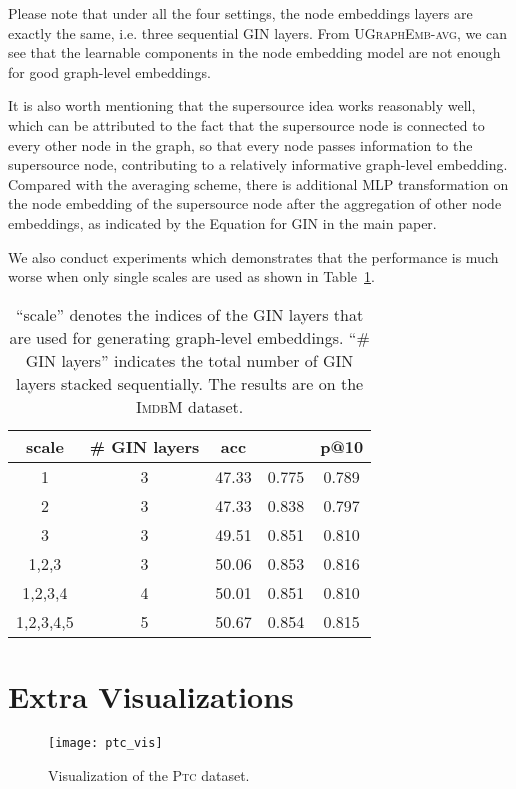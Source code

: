 \documentclass{article}
\newcommand{\model}{\textsc{UGraphEmb}\xspace}
\newcommand{\gin}{\textsc{GIN}\xspace}
\newcommand{\ptc}{\textsc{Ptc}\xspace}
\newcommand{\imdb}{\textsc{ImdbM}\xspace}
\begin{document}
Please note that under all the four settings, the node embeddings layers are exactly the same, i.e. three sequential \gin layers. From \textsc{\model}-\textsc{avg}, we can see that the learnable components in the node embedding model are not enough for good graph-level embeddings. 

It is also worth mentioning that the supersource idea works reasonably well, which can be attributed to the fact that the supersource node is connected to every other node in the graph, so that every node passes information to the supersource node, contributing to a relatively informative graph-level embedding. Compared with the averaging scheme, there is additional MLP transformation on the node embedding of the supersource node after the aggregation of other node embeddings, as indicated by the Equation for \gin in the main paper.

We also conduct experiments which demonstrates that the performance is much worse when only single scales are used as shown in Table~\ref{table:msna_scale}. 

\begin{table}
\begin{tabular}
{ccccc} \hline
\textbf{scale} & \textbf{\# \gin layers} & \textbf{acc} & \textbf{} & \textbf{p@10} \\ \hline
1 & 3 & 47.33 & 0.775 & 0.789 \\
2 & 3 & 47.33 & 0.838 & 0.797 \\
3 & 3 & 49.51 & 0.851 & 0.810 \\
1,2,3 & 3 & 50.06 & 0.853 & 0.816 \\
1,2,3,4 & 4 & 50.01 & 0.851 & 0.810 \\
1,2,3,4,5 & 5 & 50.67 & 0.854 & 0.815 \\
\hline
\end{tabular}
\centering
\caption{``scale'' denotes the indices of the \gin layers that are used for generating graph-level embeddings. ``\# \gin layers'' indicates the total number of \gin layers stacked sequentially. The results are on the \imdb dataset.}
\label{table:msna_scale}
\end{table}

 \section{Extra Visualizations}


\begin{figure*}
\centering
\texttt{[image: ptc\_vis]}
\caption{Visualization of the \ptc dataset.}
\label{fig:ptc_vis}
\vspace*{-2mm}
\end{figure*}
\end{document}
